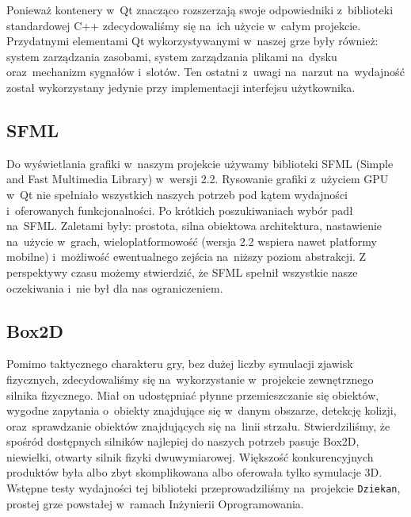 \documentclass[licencjacka]{pracamgr}
\begin{document}
      Ponieważ kontenery w~Qt znacząco rozszerzają swoje odpowiedniki z~biblioteki standardowej C++ zdecydowaliśmy się na~ich użycie
      w~całym projekcie. Przydatnymi elementami Qt wykorzystywanymi w~naszej grze były również: system zarządzania zasobami,
      system zarządzania plikami na~dysku oraz~mechanizm sygnałów i~slotów. Ten ostatni z~uwagi na~narzut na~wydajność został 
      wykorzystany jedynie przy implementacji interfejsu użytkownika.

    \subsection{SFML}
      Do wyświetlania grafiki w~naszym projekcie używamy biblioteki SFML\cite{SFML} (Simple and Fast Multimedia Library) w~wersji
      2.2. Rysowanie grafiki z~użyciem GPU w~Qt nie spełniało wszystkich naszych potrzeb pod kątem wydajności i~oferowanych funkcjonalności.
      Po krótkich poszukiwaniach wybór padł na~SFML. Zaletami były: prostota, silna obiektowa architektura, nastawienie na~użycie w~grach,
      wieloplatformowość (wersja 2.2 wspiera nawet platformy mobilne) i~możliwość ewentualnego zejścia na~niższy poziom abstrakcji.
      Z perspektywy czasu możemy stwierdzić, że SFML spełnił wszystkie nasze oczekiwania i~nie był dla nas ograniczeniem.

    \subsection{Box2D}
      Pomimo taktycznego charakteru gry, bez dużej liczby symulacji zjawisk fizycznych, zdecydowaliśmy się na~wykorzystanie
      w~projekcie zewnętrznego silnika fizycznego. Miał on udostępniać płynne przemieszczanie się obiektów, wygodne
      zapytania o~obiekty znajdujące się w~danym obszarze, detekcję kolizji, oraz~sprawdzanie obiektów znajdujących się na~linii
      strzału. Stwierdziliśmy, że spośród dostępnych silników najlepiej do naszych potrzeb pasuje Box2D\cite{BOX}, niewielki,
      otwarty silnik fizyki dwuwymiarowej. Większość konkurencyjnych produktów była albo zbyt skomplikowana albo oferowała tylko
      symulacje 3D. Wstępne testy wydajności tej biblioteki przeprowadziliśmy na~projekcie \texttt{Dziekan}, prostej grze powstałej
      w~ramach Inżynierii Oprogramowania.
\end{document}
